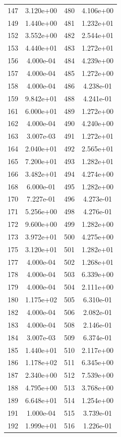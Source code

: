 \documentclass[12pt]{article}
\begin{document}
\begin{longtable}{@{}cccc@{}}
147 & 3.120e+00 & 480 & 4.106e+00 \\
149 & 1.440e+00 & 481 & 1.232e+01 \\
152 & 3.552e+00 & 482 & 2.544e+01 \\
153 & 4.440e+01 & 483 & 1.272e+01 \\
156 & 4.000e-04 & 484 & 4.239e+00 \\
157 & 4.000e-04 & 485 & 1.272e+00 \\
158 & 4.000e-04 & 486 & 4.238e-01 \\
159 & 9.842e+01 & 488 & 4.241e-01 \\
161 & 6.000e+01 & 489 & 1.272e+00 \\
162 & 4.000e-04 & 490 & 4.240e+00 \\
163 & 3.007e-03 & 491 & 1.272e+01 \\
164 & 2.040e+01 & 492 & 2.565e+01 \\
165 & 7.200e+01 & 493 & 1.282e+01 \\
166 & 3.482e+01 & 494 & 4.274e+00 \\
168 & 6.000e-01 & 495 & 1.282e+00 \\
170 & 7.227e-01 & 496 & 4.273e-01 \\
171 & 5.256e+00 & 498 & 4.276e-01 \\
172 & 9.600e+00 & 499 & 1.282e+00 \\
173 & 3.972e+01 & 500 & 4.275e+00 \\
175 & 3.120e+01 & 501 & 1.282e+01 \\
177 & 4.000e-04 & 502 & 1.268e+01 \\
178 & 4.000e-04 & 503 & 6.339e+00 \\
179 & 4.000e-04 & 504 & 2.111e+00 \\
180 & 1.175e+02 & 505 & 6.310e-01 \\
182 & 4.000e-04 & 506 & 2.082e-01 \\
183 & 4.000e-04 & 508 & 2.146e-01 \\
184 & 3.007e-03 & 509 & 6.374e-01 \\
185 & 1.440e+01 & 510 & 2.117e+00 \\
186 & 1.178e+02 & 511 & 6.345e+00 \\
187 & 2.340e+00 & 512 & 7.539e+00 \\
188 & 4.795e+00 & 513 & 3.768e+00 \\
189 & 6.648e+01 & 514 & 1.254e+00 \\
191 & 1.000e-04 & 515 & 3.739e-01 \\
192 & 1.999e+01 & 516 & 1.226e-01 \\

\end{longtable}
\end{document}
